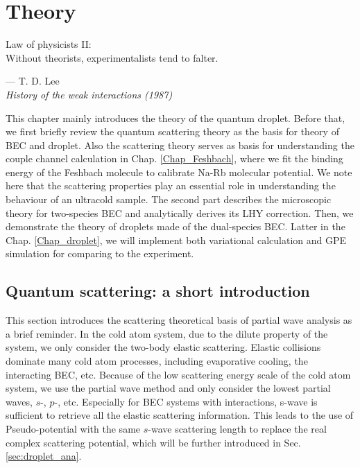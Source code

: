\chapter{Theory}
\label{Chap:theory}

\setlength{\unitlength}{1pt}
\setlength{\epigraphwidth}{10cm}
\epigraph{Law of physicists II: \\ Without theorists, experimentalists tend to falter. \cite{Lee:1992ui}}{--- T. D. Lee\\ \textit{History of the weak interactions (1987)}}

This chapter mainly introduces the theory of the quantum droplet. Before that, we first briefly review the quantum scattering theory as the basis for theory of BEC and droplet. Also the scattering theory serves as basis for understanding the couple channel calculation in Chap. \ref{Chap_Feshbach}, where we fit the binding energy of the Feshbach molecule to calibrate Na-Rb molecular potential. We note here that the scattering properties play an essential role in understanding the behaviour of an ultracold sample. The second part describes the microscopic theory for two-species BEC and analytically derives its LHY correction. Then, we demonstrate the theory of droplets made of the dual-species BEC. Latter in the Chap. \ref{Chap_droplet}, we will implement both variational calculation and GPE simulation for comparing to the experiment.

\section{Quantum scattering: a short introduction}
\label{sec:quan_scat}

This section introduces the scattering theoretical basis of partial wave analysis as a brief reminder. In the cold atom system, due to the dilute property of the system, we only consider the two-body elastic scattering. Elastic collisions dominate many cold atom processes, including evaporative cooling, the interacting BEC, etc. Because of the low scattering energy scale of the cold atom system, we use the partial wave method and only consider the lowest partial waves, $s$-, $p$-, etc. Especially for BEC systems with interactions, s-wave is sufficient to retrieve all the elastic scattering information. This leads to the use of Pseudo-potential with the same $s$-wave scattering length to replace the real complex scattering potential, which will be further introduced in Sec. \ref{sec:droplet_ana}.

